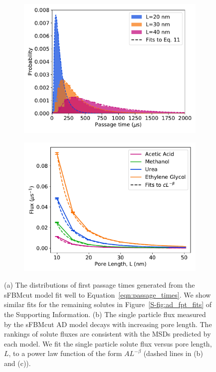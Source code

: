 \documentclass[aps,pre,preprint,groupedaddress]{revtex4-2}
\begin{document}
  \begin{figure}
  \centering
  \begin{subfigure}{0.485\textwidth}
  \includegraphics[width=\textwidth]{fpt_distributions.pdf}
  \caption{}\label{fig:fpt_distributions}
  \end{subfigure}
  \begin{subfigure}{0.485\textwidth}
  \includegraphics[width=\textwidth]{flux_curves.pdf}
  \caption{}\label{fig:flux_curves_ad}
  \end{subfigure}
  \caption{(a) The distributions of first passage times generated from the sFBMcut model
  fit well to Equation~\ref{eqn:passage_times}. We show similar fits for the remaining
  solutes in Figure~\ref{S-fig:ad_fpt_fits} of the Supporting Information. (b) The 
  single particle flux measured by the sFBMcut AD model decays with increasing pore 
  length. The rankings of solute fluxes are consistent with the MSDs predicted by each
  model. We fit the single particle solute flux versus pore length, $L$, to a power law
  function of the form $AL^{-\beta}$ (dashed lines in (b) and (c)). 
  }\label{fig:flux_curves}
  \end{figure}
\end{document}
